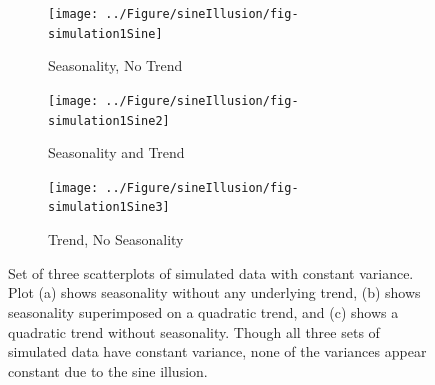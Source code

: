 \documentclass[11pt]{isuthesis}\usepackage[]{graphicx}\usepackage[]{color}
\newenvironment{knitrout}{}{} %
\begin{document}
\begin{figure}[h!tbp]\centering
\begin{subfigure}[b]{.31\textwidth}
  \centering
\begin{knitrout}
\color{fgcolor}

{\centering \texttt{[image: ../Figure/sineIllusion/fig-simulation1Sine]} 

}



\end{knitrout}

  \caption{\small Seasonality, No Trend}
  \label{simulation1}
\end{subfigure}
\begin{subfigure}[b]{.31\textwidth}\centering
\begin{knitrout}
\color{fgcolor}

{\centering \texttt{[image: ../Figure/sineIllusion/fig-simulation1Sine2]} 

}



\end{knitrout}

  \caption{\small Seasonality and Trend}
  \label{simulation2}
\end{subfigure}
\begin{subfigure}[b]{.31\textwidth}\centering
\begin{knitrout}
\color{fgcolor}

{\centering \texttt{[image: ../Figure/sineIllusion/fig-simulation1Sine3]} 

}



\end{knitrout}

  \caption{\small Trend, No Seasonality}
  \label{simulation3}
\end{subfigure}
\caption[Trend, seasonality, and the sine illusion]{Set of three scatterplots of simulated data with constant variance. Plot (a) shows seasonality without any underlying trend, (b) shows seasonality superimposed on a quadratic trend, and (c) shows a quadratic trend without seasonality. Though all three sets of simulated data have constant variance, none of the variances appear constant due to the sine illusion.}\label{fig:twoillusions-simulation}
\end{figure}
\end{document}
